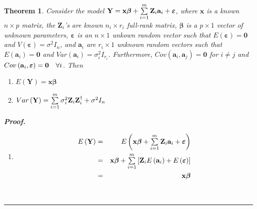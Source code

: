 \documentclass{article}
\newtheorem{theorem}{Theorem}
\newenvironment{proof}[1][Proof]{\noindent\textbf{#1.} }{\ \rule{0.5em}{0.5em}}
\begin{document}
\begin{theorem}
Consider the model $\mathbf{Y}=\mathbf{x\beta }+\tsum\limits_{i=1}^{m}%
\mathbf{Z}_{i}\mathbf{a}_{i}+\mathbf{\varepsilon }$, where $\mathbf{x}$ is a
known $n\times p$ matrix, the $\mathbf{Z}_{i}$'s are known $n_{i}\times
r_{i} $ full-rank matrix, $\mathbf{\beta }$ is a $p\times 1$ vector of
unknown parameters, $\mathbf{\varepsilon }$ is an $n\times 1$ unkown random
vector such that $E\left( \mathbf{\varepsilon }\right) =\mathbf{0}$ and $%
V\left( \mathbf{\varepsilon }\right) =\sigma ^{2}I_{n}$, and $\mathbf{a}_{i}$
are $r_{i}\times 1$ unknown random vectors such that $E\left( \mathbf{a}%
_{i}\right) =\mathbf{0}$ and $Var\left( \mathbf{a}_{i}\right) =\sigma
_{i}^{2}I_{r_{i}}$. Furthermore, $Cov\left( \mathbf{a}_{i},\mathbf{a}%
_{j}\right) =\mathbf{0}$ for $i\neq j$ and $Cov\left( \mathbf{a}_{i},\mathbf{%
\varepsilon }\right) =\mathbf{0}\quad \forall i$. Then

\begin{enumerate}
\item $E\left( \mathbf{Y}\right) =\mathbf{x\beta }$

\item $Var\left( \mathbf{Y}\right) =\tsum\limits_{i=1}^{m}\sigma _{i}^{2}%
\mathbf{Z}_{i}\mathbf{Z}_{i}^{\dagger }+\sigma ^{2}I_{n}$
\end{enumerate}

\begin{proof}
\begin{enumerate}
\item 
\begin{eqnarray*}
E\left( \mathbf{Y}\right) &=&E\left( \mathbf{x\beta }+\tsum\limits_{i=1}^{m}%
\mathbf{Z}_{i}\mathbf{a}_{i}+\mathbf{\varepsilon }\right) \\
&=&\mathbf{x\beta }+\tsum\limits_{i=1}^{m}\left[ \mathbf{Z}_{i}E\left( 
\mathbf{a}_{i}\right) +E\left( \mathbf{\varepsilon }\right) \right] \\
&=&\mathbf{x\beta }
\end{eqnarray*}


\end{enumerate}
\end{proof}
\end{theorem}
\end{document}
